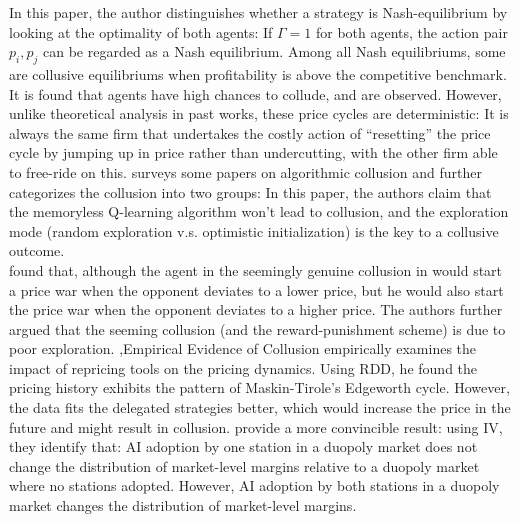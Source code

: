 \documentclass[10pt]{report}
\begin{document}
In this paper, the author distinguishes whether a strategy is Nash-equilibrium by looking at the optimality of both agents:
If $\Gamma=1$ for both agents, the action pair $p_i,p_j$ can be regarded as a Nash equilibrium. Among all Nash equilibriums, some are collusive equilibriums when profitability is above the competitive benchmark.
It is found that agents have high chances to collude, and  are observed. However, unlike theoretical analysis in past works, these price cycles are deterministic: It is always the same firm that undertakes the
costly action of “resetting” the price cycle by jumping up in price rather than undercutting, with the other firm able to free-ride on this.
\cite{calvano2023algorithmic} surveys some papers on algorithmic collusion and further categorizes the collusion into two groups:
In this paper, the authors claim that the memoryless Q-learning algorithm won't lead to collusion, and the exploration mode (random exploration v.s. optimistic initialization) is the key to a collusive outcome. \\
\cite{epivent2024algorithmic} found that, although the agent in the seemingly genuine collusion in \cite{calvano2020artificial} would start a price war when the opponent deviates to a lower price, but he would also start the price war when the opponent deviates to a higher price. The authors further argued that the seeming collusion (and the reward-punishment scheme) is due to poor exploration.
\sep{Empirical Evidence of Collusion}
\cite{musolff2022algorithmic} empirically examines the impact of repricing tools on the pricing dynamics. Using RDD, he found the pricing history exhibits the pattern of Maskin-Tirole’s Edgeworth cycle. However, the data fits the delegated strategies better, which would increase the price in the future and might result in collusion. \cite{clark2023algorithmic} provide a more convincible result: using IV, they identify that: AI adoption by one station in a duopoly market does not change the distribution of market-level margins relative to a duopoly market where no stations adopted. However, AI adoption by both stations in a duopoly market changes the distribution of market-level margins.
\end{document}
